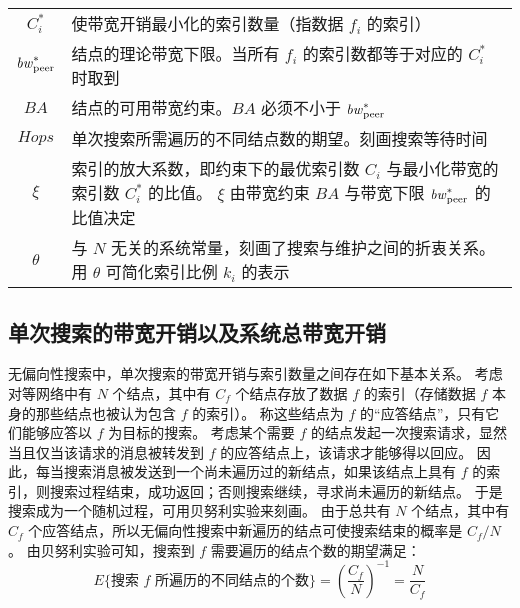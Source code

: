 \documentclass[degree=doctor]{thuthesis}
\begin{document}
\begin{table}[htb]
\begin{tabular}{cp{}}
    $C_i^*$                             & 使带宽开销最小化的索引数量（指数据 $f_i$ 的索引）                                                \\
    $\mathit{bw}_{\text{peer}}^*$                         & 结点的理论带宽下限。当所有 $f_i$ 的索引数都等于对应的 $C_i^*$ 时取到                             \\
    $\mathit{BA}$                       & 结点的可用带宽约束。$\mathit{BA}$ 必须不小于 $\mathit{bw}_{\text{peer}}^*$                                         \\
    $\mathit{Hops}$                     & 单次搜索所需遍历的不同结点数的期望。刻画搜索等待时间                                             \\
    $\xi$                               & 索引的放大系数，即约束下的最优索引数 $C_i$ 与最小化带宽的索引数 $C_i^*$ 的比值。
                                          $\xi$ 由带宽约束 $\mathit{BA}$ 与带宽下限 $\mathit{bw}_{\text{peer}}^*$ 的比值决定                                 \\
    $\theta$                            & 与 $N$ 无关的系统常量，刻画了搜索与维护之间的折衷关系。用 $\theta$ 可简化索引比例 $k_i$ 的表示   \\
    \bottomrule
  \end{tabular}
\end{table}


\subsection{单次搜索的带宽开销以及系统总带宽开销}

无偏向性搜索中，单次搜索的带宽开销与索引数量之间存在如下基本关系。
考虑对等网络中有 $N$ 个结点，其中有 $C_f$ 个结点存放了数据 $f$ 的索引（存储数据 $f$ 本身的那些结点也被认为包含 $f$ 的索引）。
称这些结点为 $f$ 的“应答结点”，只有它们能够应答以 $f$ 为目标的搜索。
考虑某个需要 $f$ 的结点发起一次搜索请求，显然当且仅当该请求的消息被转发到 $f$ 的应答结点上，该请求才能够得以回应。
因此，每当搜索消息被发送到一个尚未遍历过的新结点，如果该结点上具有 $f$ 的索引，则搜索过程结束，成功返回；否则搜索继续，寻求尚未遍历的新结点。
于是搜索成为一个随机过程，可用贝努利实验来刻画。
由于总共有 $N$ 个结点，其中有 $C_f$ 个应答结点，所以无偏向性搜索中新遍历的结点可使搜索结束的概率是 $C_f / N$。
由贝努利实验可知，搜索到 $f$ 需要遍历的结点个数的期望满足：
\begin{equation}
  E \{\text{搜索 $f$ 所遍历的不同结点的个数}\} = \left(\frac{C_f}{N}\right)^{-1} = \frac{N}{C_f}
\end{equation}
\end{document}
